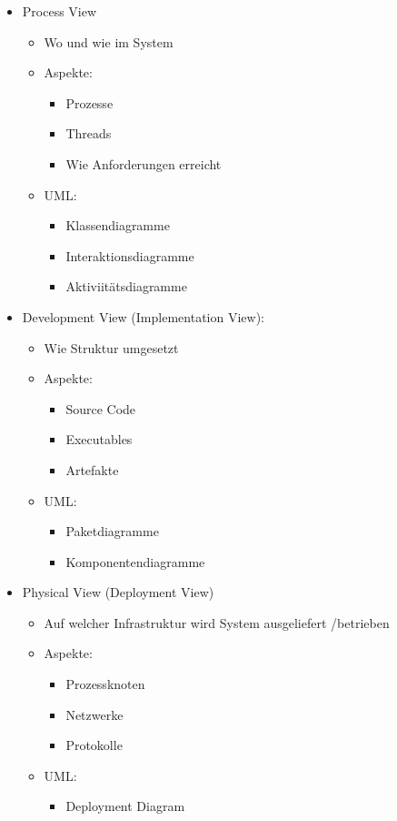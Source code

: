 \documentclass{article}
\begin{document}
\begin{itemize}
	\item Process View
	\begin{itemize}
			\item Wo und wie im System
			\item Aspekte: 
			\begin{itemize}
				\item Prozesse
				\item Threads
				\item Wie Anforderungen erreicht
			\end{itemize}
			\item \colorbox{yellow!30}{UML:}
			\begin{itemize}
				\item Klassendiagramme
				\item Interaktionsdiagramme
				\item Aktiviitätsdiagramme
				\end{itemize}
		\end{itemize}
	
\end{itemize}

\begin{itemize}
	\item Development View (Implementation View):
	\begin{itemize}
			\item Wie Struktur umgesetzt
			\item Aspekte: 
			\begin{itemize}
				\item Source Code
				\item Executables
				\item Artefakte
			\end{itemize}
			\item \colorbox{yellow!30}{UML:}
			\begin{itemize}
				\item Paketdiagramme
				\item Komponentendiagramme
				\end{itemize}
		\end{itemize}	
\end{itemize}


\begin{itemize}
	\item Physical View (Deployment View)
	\begin{itemize}
			\item Auf welcher Infrastruktur wird System ausgeliefert /betrieben
			\item Aspekte: 
			\begin{itemize}
				\item Prozessknoten
				\item Netzwerke
				\item Protokolle
			\end{itemize}
			\item \colorbox{yellow!30}{UML:}
			\begin{itemize}
				\item Deployment Diagram
			\end{itemize}
		\end{itemize}
\end{itemize}
\end{document}

